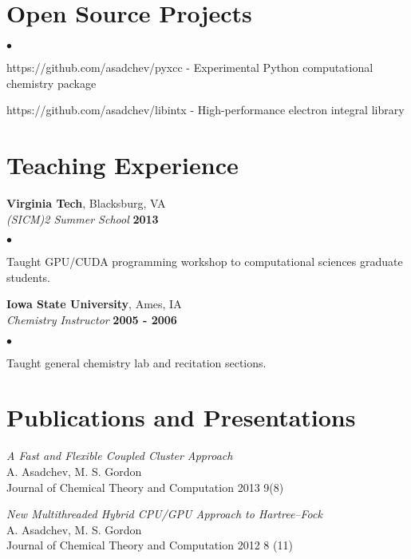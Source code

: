 \documentclass[overlap,line]{cv}
\newenvironment{list2}{
  \begin{list}{$\bullet$}{%
      \setlength{\itemsep}{0in}
      \setlength{\parsep}{0in} \setlength{\parskip}{0in}
      \setlength{\topsep}{0in} \setlength{\partopsep}{0in} 
      \setlength{\leftmargin}{0.2in}}}{\end{list}}
\begin{document}
\begin{resume}
\section{\sc Open Source Projects}
\vspace{.1in}
\begin{list2}
  \item https://github.com/asadchev/pyxcc - Experimental Python computational chemistry package
  \item https://github.com/asadchev/libintx - High-performance electron integral library
\end{list2}

\section{\sc Teaching Experience}
\vspace{.05in}
{\bf Virginia Tech}, Blacksburg, VA \\
{\em (SICM)2 Summer School} \hfill {\bf 2013}

\begin{list2}
\item Taught GPU/CUDA programming workshop to computational sciences graduate students.
\end{list2}

{\bf Iowa State University}, Ames, IA \\
{\em Chemistry Instructor}  \hfill {\bf 2005 - 2006}

\begin{list2}
\item Taught general chemistry lab and recitation sections. 
\end{list2}


\section{\sc Publications and Presentations}
\vspace{.05in}

{\it A Fast and Flexible Coupled Cluster Approach} \\
A. Asadchev, M. S. Gordon \\
Journal of Chemical Theory and Computation 2013 9(8)

{\it New Multithreaded Hybrid CPU/GPU Approach to Hartree–Fock} \\
A. Asadchev, M. S. Gordon \\
Journal of Chemical Theory and Computation 2012 8 (11)


\end{resume}
\end{document}
